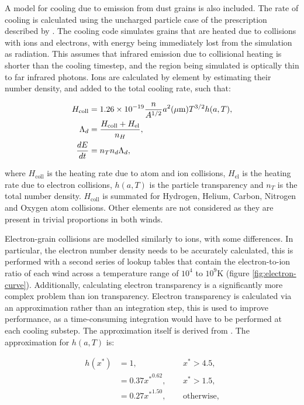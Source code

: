 A model for cooling due to emission from dust grains is also included. The rate of cooling is calculated using the uncharged particle case of the prescription described by \cite{dwek_infrared_1981}. The cooling code simulates grains that are heated due to collisions with ions and electrons, with energy being immediately lost from the simulation as radiation. This assumes that infrared emission due to collisional heating is shorter than the cooling timestep, and the region being simulated is optically thin to far infrared photons. Ions are calculated by element by estimating their number density, and added to the total cooling rate, such that:

\begin{subequations}
  \begin{align}
    H_\text{coll} & = 1.26 \times 10^{-19} \frac{n}{A^{1/2}} a^2(\mu \text m) T^{3/2} h(a,T) , \\
        \Lambda_d & = \frac{H_\text{coll} + H_\text{el}}{n_H} , \\
    \frac{dE}{dt} & = n_T n_d \Lambda_d ,
  \end{align}
\end{subequations}

where $H_\text{coll}$ is the heating rate due to atom and ion collisions, $H_\text{el}$ is the heating rate due to electron collisions, $h(a,T)$ is the particle transparency and $n_T$ is the total number density. $H_\text{coll}$ is summated for Hydrogen, Helium, Carbon, Nitrogen and Oxygen atom collisions. Other elements are not considered as they are present in trivial proportions in both winds.

Electron-grain collisions are modelled similarly to ions, with some differences. In particular, the electron number density needs to be accurately calculated, this is performed with a second series of lookup tables that contain the electron-to-ion ratio of each wind across a temperature range of $10^4$ to $10^9\si{\kelvin}$ (figure \ref{fig:electron-curve}). Additionally, calculating electron transparency is a significantly more complex problem than ion transparency. Electron transparency is calculated via an approximation rather than an integration step, this is used to improve performance, as a time-consuming integration would have to be performed at each cooling substep. The approximation itself is derived from \cite{dwek_infrared_1981}. The approximation for $h(a,T)$ is:

\begin{equation}
  \begin{alignedat}{3}
    h(x^*) & = 1 ,                && ~~ x^* > 4.5, \\
           & = 0.37{x^*}^{0.62} , && ~~ x^* > 1.5 , \\
           & = 0.27{x^*}^{1.50} , && ~~ \text{otherwise,}
  \end{alignedat}
\end{equation}

